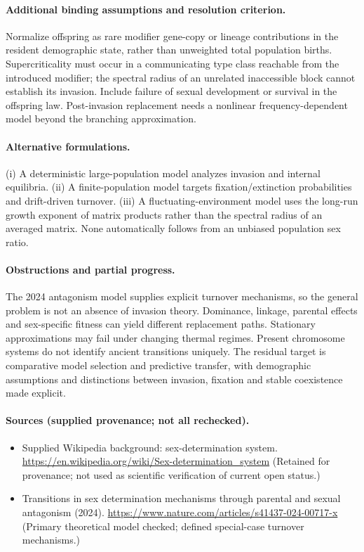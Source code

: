 \documentclass[11pt]{article}
\begin{document}
\paragraph{Additional binding assumptions and resolution criterion.} Normalize offspring as rare modifier gene-copy or lineage contributions in the resident demographic state, rather than unweighted total population births. Supercriticality must occur in a communicating type class reachable from the introduced modifier; the spectral radius of an unrelated inaccessible block cannot establish its invasion. Include failure of sexual development or survival in the offspring law. Post-invasion replacement needs a nonlinear frequency-dependent model beyond the branching approximation.

\paragraph{Alternative formulations.} (i) A deterministic large-population model analyzes invasion and internal equilibria. (ii) A finite-population model targets fixation/extinction probabilities and drift-driven turnover. (iii) A fluctuating-environment model uses the long-run growth exponent of matrix products rather than the spectral radius of an averaged matrix. None automatically follows from an unbiased population sex ratio.

\paragraph{Obstructions and partial progress.} The 2024 antagonism model supplies explicit turnover mechanisms, so the general problem is not an absence of invasion theory. Dominance, linkage, parental effects and sex-specific fitness can yield different replacement paths. Stationary approximations may fail under changing thermal regimes. Present chromosome systems do not identify ancient transitions uniquely. The residual target is comparative model selection and predictive transfer, with demographic assumptions and distinctions between invasion, fixation and stable coexistence made explicit.

\paragraph{Sources (supplied provenance; not all rechecked).} \begin{itemize}
\item Supplied Wikipedia background: sex-determination system. \url{https://en.wikipedia.org/wiki/Sex-determination_system} (Retained for provenance; not used as scientific verification of current open status.)
\item Transitions in sex determination mechanisms through parental and sexual antagonism (2024). \url{https://www.nature.com/articles/s41437-024-00717-x} (Primary theoretical model checked; defined special-case turnover mechanisms.)
\end{itemize}
\end{document}
